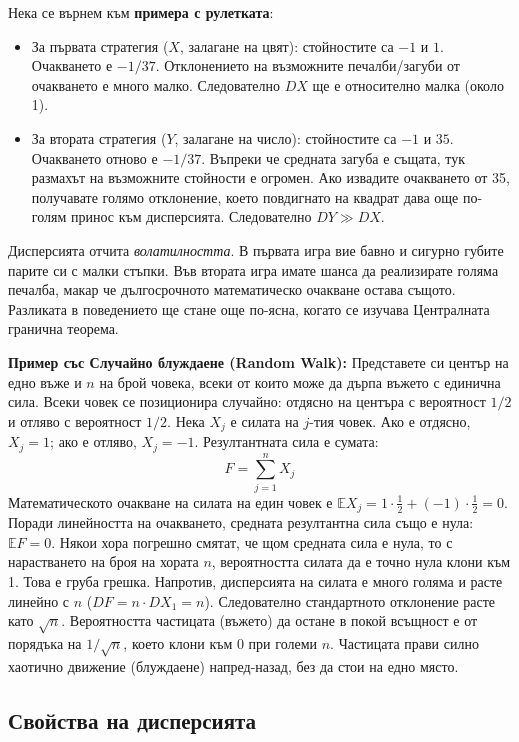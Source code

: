\documentclass{article}
\begin{document}
Нека се върнем към \textbf{примера с рулетката}:
\begin{itemize}
    \item За първата стратегия ($X$, залагане на цвят): стойностите са $-1$ и $1$. Очакването е $-1/37$. Отклонението на възможните печалби/загуби от очакването е много малко. Следователно $DX$ ще е относително малка (около 1).
    \item За втората стратегия ($Y$, залагане на число): стойностите са $-1$ и $35$. Очакването отново е $-1/37$. Въпреки че средната загуба е същата, тук размахът на възможните стойности е огромен. Ако извадите очакването от 35, получавате голямо отклонение, което повдигнато на квадрат дава още по-голям принос към дисперсията. Следователно $DY \gg DX$.
\end{itemize}
Дисперсията отчита \textit{волатилността}. В първата игра вие бавно и сигурно губите парите си с малки стъпки. Във втората игра имате шанса да реализирате голяма печалба, макар че дългосрочното математическо очакване остава същото. Разликата в поведението ще стане още по-ясна, когато се изучава Централната гранична теорема.

\textbf{Пример със Случайно блуждаене (Random Walk):}
Представете си център на едно въже и $n$ на брой човека, всеки от които може да дърпа въжето с единична сила. Всеки човек се позиционира случайно: отдясно на центъра с вероятност $1/2$ и отляво с вероятност $1/2$. 
Нека $X_j$ е силата на $j$-тия човек. Ако е отдясно, $X_j = 1$; ако е отляво, $X_j = -1$.
Резултантната сила е сумата:
\[ F = \sum_{j=1}^n X_j \]
Математическото очакване на силата на един човек е $\mathbb{E}X_j = 1 \cdot \frac{1}{2} + (-1) \cdot \frac{1}{2} = 0$. Поради линейността на очакването, средната резултантна сила също е нула: $\mathbb{E}F = 0$.
Някои хора погрешно смятат, че щом средната сила е нула, то с нарастването на броя на хората $n$, вероятността силата да е точно нула клони към 1. Това е груба грешка. Напротив, дисперсията на силата е много голяма и расте линейно с $n$ ($DF = n \cdot DX_1 = n$). Следователно стандартното отклонение расте като $\sqrt{n}$. Вероятността частицата (въжето) да остане в покой всъщност е от порядъка на $1/\sqrt{n}$, което клони към $0$ при големи $n$. Частицата прави силно хаотично движение (блуждаене) напред-назад, без да стои на едно място.

\subsection{Свойства на дисперсията}
\end{document}
